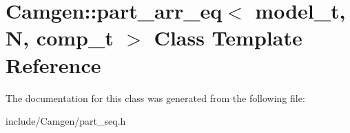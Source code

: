\hypertarget{a00393}{\section{Camgen\-:\-:part\-\_\-arr\-\_\-eq$<$ model\-\_\-t, N, comp\-\_\-t $>$ Class Template Reference}
\label{a00393}
}


The documentation for this class was generated from the following file\-:\begin{DoxyCompactItemize}
\item 
include/\-Camgen/part\-\_\-seq.\-h\end{DoxyCompactItemize}
